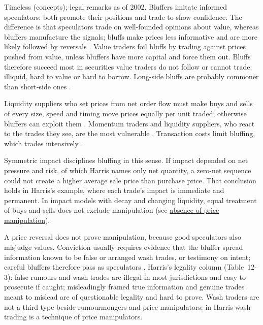 \begin{qfdefinition}
 Timeless (concepts); legal remarks as of 2002. Bluffers imitate informed speculators: both promote their positions and trade to show confidence. The difference is that speculators trade on well-founded opinions about value, whereas bluffers manufacture the signals; bluffs make prices less informative and are more likely followed by reversals \citep[same chap., sec.~12.2.1, pp.~265--267]{alpha-harris}. Value traders foil bluffs by trading against prices pushed from value, unless bluffers have more capital and force them out. Bluffs therefore succeed most in securities value traders do not follow or cannot trade: illiquid, hard to value or hard to borrow. Long-side bluffs are probably commoner than short-side ones \citep[same chap., sec.~12.2.2, pp.~268--269]{alpha-harris}.

 Liquidity suppliers who set prices from net order flow must make buys and sells of every size, speed and timing move prices equally per unit traded; otherwise bluffers can exploit them \citep[same chap., sec.~12.3, pp.~271--273]{alpha-harris}. Momentum traders and liquidity suppliers, who react to the trades they see, are the most vulnerable \citep[same chap., sec.~12.4, p.~274]{alpha-harris}. Transaction costs limit bluffing, which trades intensively \citep[same chap., p.~273]{alpha-harris}.

Symmetric impact disciplines bluffing in this sense. If impact depended on net pressure and risk, of which Harris names only net quantity, a zero-net sequence could not create a higher average sale price than purchase price. That conclusion holds in Harris's example, where each trade's impact is immediate and permanent. In impact models with decay and changing liquidity, equal treatment of buys and sells does not exclude manipulation (see \hyperref[res:no-price-manipulation]{absence of price manipulation}).

 A price reversal does not prove manipulation, because good speculators also misjudge values. Conviction usually requires evidence that the bluffer spread information known to be false or arranged wash trades, or testimony on intent; careful bluffers therefore pass as speculators \citep[same chap., sec.~12.2.3, pp.~269--270]{alpha-harris}. Harris's legality column (Table~12-3): false rumours and wash trades are illegal in most jurisdictions and easy to prosecute if caught; misleadingly framed true information and genuine trades meant to mislead are of questionable legality and hard to prove. Wash traders are not a third type beside rumourmongers and price manipulators: in Harris wash trading is a technique of price manipulators.


\end{qfdefinition}
